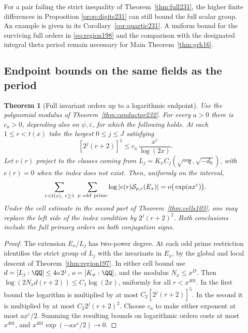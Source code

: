 \documentclass[a4paper,11pt]{article}
\newtheorem{theorem}[proposition]{Theorem}
\theoremstyle{definition}
\theoremstyle{remark}
\numberwithin{equation}{section}
\begin{document}
For a pair failing the strict inequality of Theorem~\ref{thm:full231},
the higher finite differences in Proposition
\ref{prop:digits231}
can still bound the full scalar group. An example is given in its
Corollary~\ref{cor:quartic231}.
A uniform bound for the surviving full orders in \eqref{eq:region198}
and the comparison with the designated integral theta period
remain necessary for Main Theorem~\ref{thm:grh16}.

\subsection{Endpoint bounds on the same fields as the period}\label{nav:II-40}
\begin{theorem}[Full invariant orders up to a logarithmic endpoint]
\label{thm:endpoint232}
Use the polynomial modulus of Theorem~\ref{thm:conductor232}.
For every \(a>0\) there is \(c_a>0\), depending also on
\(\psi,\varepsilon\), for which the following holds.
At each \(1\le r<t(x)\) take the largest \(0\le j\le J\)
satisfying
\[
 [2^j(r+2)]^5\le c_a\,\frac{x^\varepsilon}{\log(2x)}.
\]
Let \(e(r)\) project to the classes coming from
\(L_j=K_\psi C_j(\sqrt{-q},\sqrt{-d_0})\), with \(e(r)=0\)
when the index does not exist. Then, uniformly on the interval,
\[
   \sum_{r<t(x),\ r\ge1}\ \sum_{p\ {\rm odd\ prime}}
         \log|e(r)\mathcal S_{p,r}(E_x)|
                 =o\big(\exp(a x^\varepsilon)\big).
\]
Under the cell estimate in the second part of
Theorem~\ref{thm:cells103}, one may replace the left side of the
index condition by \(2^j(r+2)^2\). Both conclusions include the
full primary orders on both conjugation signs.
\end{theorem}
\begin{proof}
The extension \(E_x/L_j\) has two-power degree. At each odd prime
restriction identifies the strict group of \(L_j\) with the
invariants in \(E_x\), by the global and local descent of
Theorem~\ref{thm:region197}. In either cell bound use
\(d=[L_j:\QQ]\le 4o\,2^j\), \(o=[K_\psi:\QQ]\), and the
modulus \(N_x\le x^D\). Then
\(\log(2N_x d(r+2))\le C_1\log(2x)\), uniformly for all
\(r<x^{401}\). In the first bound the logarithm is multiplied
by at most \(C_2[2^j(r+2)]^5\). In the second it is multiplied
by at most \(C_2 2^j(r+2)^2\). Choose \(c_a\) to make either
exponent at most \(a x^\varepsilon/2\).
Summing the resulting bounds on logarithmic orders costs at
most \(x^{401}\), and \(x^{401}\exp(-a x^\varepsilon/2)\to0\).
\end{proof}
\end{document}

